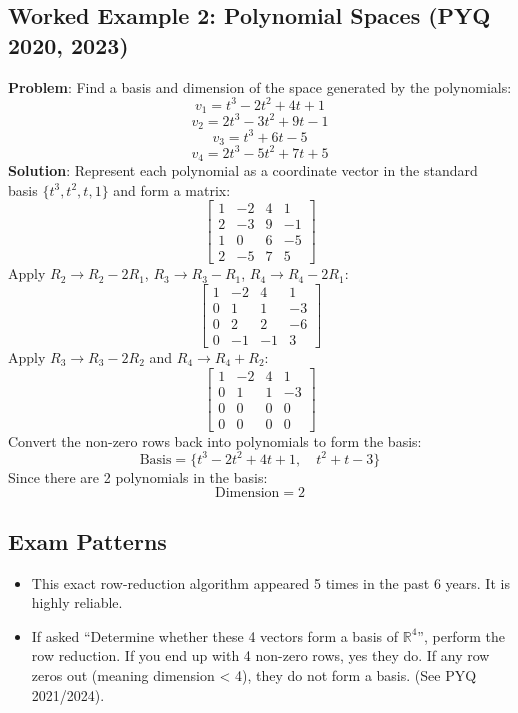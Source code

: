 \documentclass[
]{article}
\providecommand{\tightlist}{%
  \setlength{\itemsep}{0pt}\setlength{\parskip}{0pt}}
\begin{document}
\subsection{Worked Example 2: Polynomial Spaces (PYQ 2020,
2023)}\label{worked-example-2-polynomial-spaces-pyq-2020-2023}

\textbf{Problem}: Find a basis and dimension of the space generated by
the polynomials:
\[
v_1 = t^3 - 2t^2 + 4t + 1
\]
\[
v_2 = 2t^3 - 3t^2 + 9t - 1
\]
\[
v_3 = t^3 + 6t - 5
\]
\[
v_4 = 2t^3 - 5t^2 + 7t + 5
\]
\textbf{Solution}: Represent each polynomial as a coordinate vector in
the standard basis \(\lbrace t^3, t^2, t, 1\rbrace\) and form a matrix:
\[
\begin{bmatrix}
1 & -2 & 4 & 1 \\
2 & -3 & 9 & -1 \\
1 & 0 & 6 & -5 \\
2 & -5 & 7 & 5
\end{bmatrix}
\]
Apply \(R_2 \to R_2 - 2R_1\), \(R_3 \to R_3 - R_1\),
\(R_4 \to R_4 - 2R_1\):
\[
\begin{bmatrix}
1 & -2 & 4 & 1 \\
0 & 1 & 1 & -3 \\
0 & 2 & 2 & -6 \\
0 & -1 & -1 & 3
\end{bmatrix}
\]
Apply \(R_3 \to R_3 - 2R_2\) and \(R_4 \to R_4 + R_2\):
\[
\begin{bmatrix}
1 & -2 & 4 & 1 \\
0 & 1 & 1 & -3 \\
0 & 0 & 0 & 0 \\
0 & 0 & 0 & 0
\end{bmatrix}
\]
Convert the non-zero rows back into polynomials to form the basis:
\[
\text{Basis} = \lbrace t^3 - 2t^2 + 4t + 1, \quad t^2 + t - 3 \rbrace
\]
Since there are 2 polynomials in the basis:
\[
\text{Dimension} = 2
\]

\subsection{Exam Patterns}\label{exam-patterns-34}

\begin{itemize}
\tightlist
\item
  This exact row-reduction algorithm appeared 5 times in the past 6
  years. It is highly reliable.
\item
  If asked ``Determine whether these 4 vectors form a basis of
  \(\mathbb{R}^4\)'', perform the row reduction. If you end up with 4
  non-zero rows, yes they do. If any row zeros out (meaning dimension
  \textless{} 4), they do not form a basis. (See PYQ 2021/2024).
\end{itemize}
\end{document}
